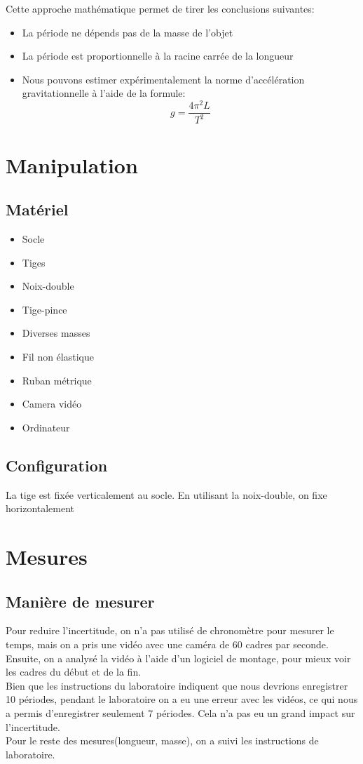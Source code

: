\documentclass[12pt,a4paper]{article}
\begin{document}
    Cette approche mathématique permet de tirer les conclusions suivantes:
    \begin{itemize}
        \item La période ne dépends pas de la masse de l'objet
        \item La période est proportionnelle à la racine carrée de la longueur
        \item Nous pouvons estimer expérimentalement la norme d'accélération gravitationnelle à l'aide de la formule: 
        \begin{equation*}
            g=\frac{4\pi^2L}{T^2}
        \end{equation*}
    \end{itemize}

    \section{Manipulation}
    \subsection{Matériel}
    \begin{itemize}
        \item Socle
        \item Tiges
        \item Noix-double
        \item Tige-pince
        \item Diverses masses
        \item Fil non élastique
        \item Ruban métrique
        \item Camera vidéo
        \item Ordinateur
    \end{itemize}
    \subsection{Configuration}
    La tige est fixée verticalement au socle. En utilisant la noix-double, on fixe horizontalement

    \section{Mesures}
    \subsection{Manière de mesurer}
    Pour reduire l'incertitude, on n'a pas utilisé de chronomètre pour mesurer le temps, mais on a pris une vidéo avec une caméra de 60 cadres par seconde. Ensuite, on a analysé la vidéo à l'aide d'un logiciel de montage, pour mieux voir les cadres du début et de la fin. \\
    Bien que les instructions du laboratoire indiquent que nous devrions enregistrer 10 périodes, pendant le laboratoire on a eu une erreur avec les vidéos, ce qui nous a permis d'enregistrer seulement 7 périodes. Cela n'a pas eu un grand impact sur l'incertitude. \\
    Pour le reste des mesures(longueur, masse), on a suivi les instructions de laboratoire.
\end{document}
